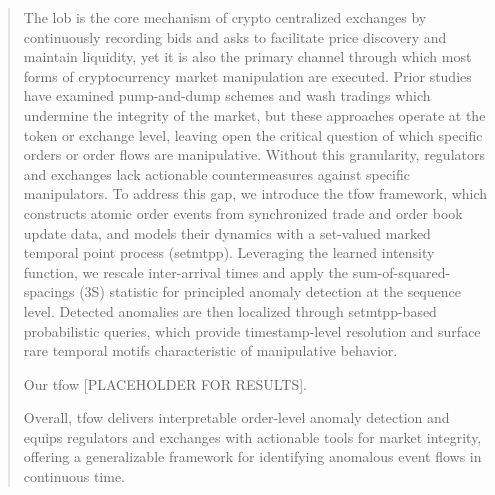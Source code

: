 \begin{abstract}


The \acf{lob} is the core mechanism of crypto centralized exchanges by continuously recording bids and asks to facilitate price discovery and maintain liquidity, yet it is also the primary channel through which most forms of cryptocurrency market manipulation are executed. Prior studies have examined pump-and-dump schemes and wash tradings which undermine the integrity of the market, but these approaches operate at the token or exchange level, leaving open the critical question of which specific orders or order flows are manipulative. Without this granularity, regulators and exchanges lack actionable countermeasures against specific manipulators. 
To address this gap, we introduce the \acs{tfow} framework, which constructs atomic order events from synchronized trade and order book update data, and models their dynamics with a set-valued marked temporal point process (\ac{setmtpp}). Leveraging the learned intensity function, we rescale inter-arrival times and apply the sum-of-squared-spacings (3S) statistic for principled anomaly detection at the sequence level. Detected anomalies are then localized through \ac{setmtpp}-based probabilistic queries, which  provide timestamp-level resolution and surface rare temporal motifs characteristic of manipulative behavior. 

Our \ac{tfow} [PLACEHOLDER FOR RESULTS]. 

Overall, \ac{tfow} delivers interpretable order-level anomaly detection and equips regulators and exchanges with actionable tools for market integrity, offering a generalizable framework for identifying anomalous event flows in continuous time.



\end{abstract}